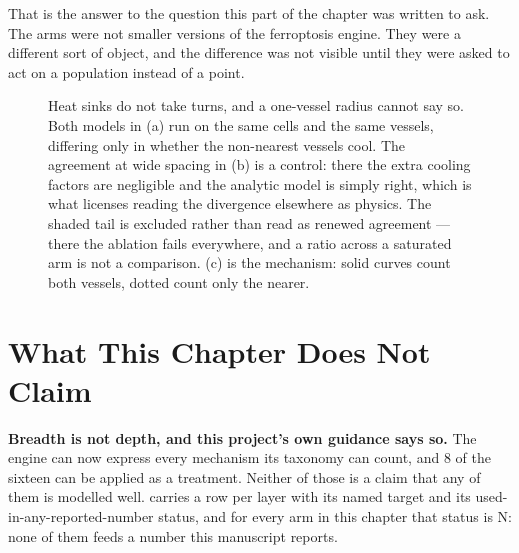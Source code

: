 \documentclass[11pt,twoside,openright]{report}
\begin{document}
That is the answer to the question this part of the chapter was written to ask. The arms were not smaller versions of the ferroptosis engine. They were a different sort of object, and the difference was not visible until they were asked to act on a population instead of a point.

\begin{figure}[tbp]
\setcounter{figure}{46}
\caption{Heat sinks do not take turns, and a one-vessel radius cannot say so. Both models in (a) run on the same cells and the same vessels, differing only in whether the non-nearest vessels cool. The agreement at wide spacing in (b) is a control: there the extra cooling factors are negligible and the analytic model is simply right, which is what licenses reading the divergence elsewhere as physics. The shaded tail is excluded rather than read as renewed agreement --- there the ablation fails everywhere, and a ratio across a saturated arm is not a comparison. (c) is the mechanism: solid curves count both vessels, dotted count only the nearer.}
\label{fig:fig51_ablation_superposition}
\end{figure}

\section{What This Chapter Does Not Claim}

\textbf{Breadth is not depth, and this project's own guidance says so.} The engine can now express every mechanism its taxonomy can count, and 8 of the sixteen can be applied as a treatment. Neither of those is a claim that any of them is modelled well.  carries a row per layer with its named target and its used-in-any-reported-number status, and for every arm in this chapter that status is N: none of them feeds a number this manuscript reports.
\end{document}
